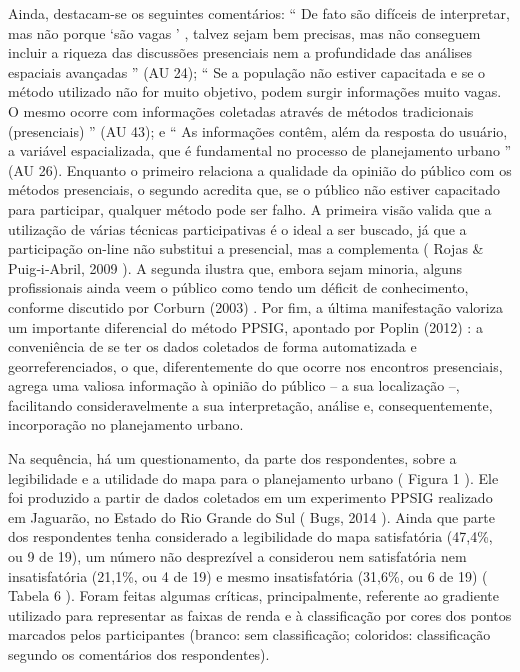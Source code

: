 \documentclass{article}
\begin{document}

Ainda, destacam-se os seguintes comentários: “%
De fato são difíceis de
						interpretar, mas não porque ‘são vagas%
’%
, talvez sejam bem
						precisas, mas não conseguem incluir a riqueza das discussões presenciais nem
						a profundidade das análises espaciais avançadas%
” (AU 24);
						“%
Se a população não estiver capacitada e se o método utilizado não
						for muito objetivo, podem surgir informações muito vagas. O mesmo ocorre com
						informações coletadas através de métodos tradicionais
					(presenciais)%
” (AU 43); e “%
As informações contêm, além da
						resposta do usuário, a variável espacializada, que é fundamental no processo
						de planejamento urbano%
” (AU 26). Enquanto o primeiro relaciona a
					qualidade da opinião do público com os métodos presenciais, o segundo acredita
					que, se o público não estiver capacitado para participar, qualquer método pode
					ser falho. A primeira visão valida que a utilização de várias técnicas
					participativas é o ideal a ser buscado, já que a participação on-line não
					substitui a presencial, mas a complementa (%
Rojas \& Puig‐i‐Abril, 2009%
). A segunda ilustra que, embora sejam
					minoria, alguns profissionais ainda veem o público como tendo um déficit de
					conhecimento, conforme discutido por %
Corburn
						(2003)%
. Por fim, a última manifestação valoriza um importante
					diferencial do método PPSIG, apontado por %
Poplin (2012)%
: a conveniência de se ter os dados coletados de forma
					automatizada e georreferenciados, o que, diferentemente do que ocorre nos
					encontros presenciais, agrega uma valiosa informação à opinião do público – a
					sua localização –, facilitando consideravelmente a sua interpretação, análise e,
					consequentemente, incorporação no planejamento urbano.

Na sequência, há um questionamento, da parte dos respondentes, sobre a
					legibilidade e a utilidade do mapa para o planejamento urbano (%
Figura 1%
). Ele foi produzido a partir de
					dados coletados em um experimento PPSIG realizado em Jaguarão, no Estado do Rio
					Grande do Sul (%
Bugs, 2014%
). Ainda que
					parte dos respondentes tenha considerado a legibilidade do mapa satisfatória
					(47,4\%, ou 9 de 19), um número não desprezível a considerou nem satisfatória nem
					insatisfatória (21,1\%, ou 4 de 19) e mesmo insatisfatória (31,6\%, ou 6 de 19)
						(%
Tabela 6%
). Foram feitas algumas
					críticas, principalmente, referente ao gradiente utilizado para representar as
					faixas de renda e à classificação por cores dos pontos marcados pelos
					participantes (branco: sem classificação; coloridos: classificação segundo os
					comentários dos respondentes).
\end{document}
